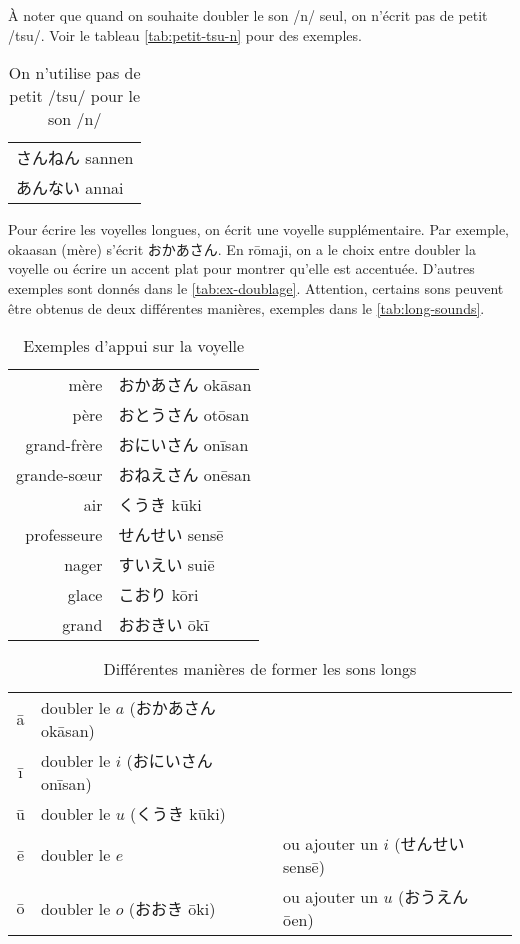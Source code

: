 \documentclass[a4paper,10pt,french,openany]{memoir}
\begin{document}
À noter que quand on souhaite doubler le son /n/ seul, on n'écrit pas de petit /tsu/. Voir le tableau \autoref{tab:petit-tsu-n} pour des exemples.

\begin{table}[htbp]
 \centering
 \begin{tabular}{l}
  さんねん sannen\\
  あんない annai
 \end{tabular}
 \caption{On n'utilise pas de petit /tsu/ pour le son /n/}
 \label{tab:petit-tsu-n}
\end{table}

Pour écrire les voyelles longues, on écrit une voyelle supplémentaire. Par exemple, okaasan (mère) s'écrit おかあさん. En rōmaji, on a le choix entre doubler la voyelle ou écrire un accent plat pour montrer qu'elle est accentuée. D'autres exemples sont donnés dans le \autoref{tab:ex-doublage}. Attention, certains sons peuvent être obtenus de deux différentes manières, exemples dans le \autoref{tab:long-sounds}.

\begin{table}[htbp]
 \centering
 \begin{tabular}{rl}
  mère & おかあさん okāsan \\
  père & おとうさん otōsan\\
  grand-frère & おにいさん onīsan\\
  grande-sœur & おねえさん onēsan\\
  air & くうき kūki\\
  professeur\cdot{}e & せんせい sensē\\
  nager & すいえい suiē\\
  glace & こおり kōri\\
  grand & おおきい ōkī\\
 \end{tabular}
 \caption{Exemples d'appui sur la voyelle}
 \label{tab:ex-doublage}
\end{table}

\begin{table}[htbp]
 \centering
 \begin{tabular}{cll}
  ā & doubler le $a$ (おかあさん okāsan)\\
  ī & doubler le $i$ (おにいさん onīsan)\\
  ū & doubler le $u$ (くうき kūki)\\
  ē & doubler le $e$ & ou ajouter un $i$ (せんせい sensē)\\
  ō & doubler le $o$ (おおき ōki) & ou ajouter un $u$ (おうえん ōen)\\
 \end{tabular}
 \caption{Différentes manières de former les sons longs}
 \label{tab:long-sounds}
\end{table}
\end{document}
